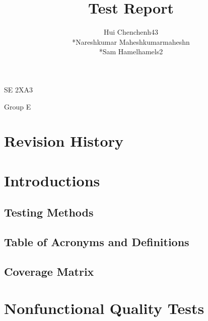 \documentclass[11pt]{article}
\begin{document}
	\begin{titlepage}
	\title {Test Report}
	\maketitle
		\begin{center}
		SE 2XA3\\
		\author{
		Hui Chen\hspace{128pt}chenh43	
		\\*Nareshkumar Maheshkumar\hspace{35pt}maheshn 
		\\*Sam Hamel\hspace{118pt}hamels2 \\
		}

		Group E
		\end{center}
	\end{titlepage}
	
	\newpage
	\tableofcontents
	\listoftables
	\newpage
	
	\section{Revision History}
	\section{Introductions}
	\subsection{Testing Methods}
	\subsection{Table of Acronyms and Definitions}
	\subsection{Coverage Matrix}

	\section{Nonfunctional Quality Tests}	
\end{document}
